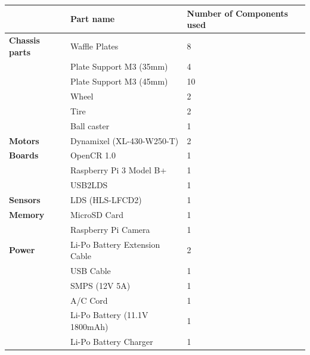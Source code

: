 \documentclass[12pt]{report}
\begin{document}
\begin{table}[H]
\centering
\begin{tabular}{|l|l|l|}
\toprule
              & \textbf{Part name}                     & \textbf{Number of Components used} \\
\midrule
\textbf{Chassis parts} & Waffle Plates                 & 8                         \\ \hline
              & Plate Support M3 (35mm)       & 4                         \\ \hline
              & Plate Support M3 (45mm)       & 10                        \\ \hline
              & Wheel                         & 2                         \\ \hline
              & Tire                          & 2                         \\ \hline
              & Ball caster                   & 1                         \\ \hline
\textbf{Motors}        & Dynamixel (XL-430-W250-T)     & 2                         \\ \hline
\textbf{Boards}        & OpenCR 1.0                    & 1                         \\ \hline
              & Raspberry Pi 3 Model B+       & 1                         \\ \hline
              & USB2LDS                       & 1                         \\ \hline
\textbf{Sensors}       & LDS (HLS-LFCD2)               & 1                         \\ \hline
\textbf{Memory}        & MicroSD Card                  & 1                         \\ \hline
              & Raspberry Pi Camera           & 1                         \\ \hline
\textbf{Power}         & Li-Po Battery Extension Cable & 2                         \\ \hline
              & USB Cable                     & 1                         \\ \hline
              & SMPS (12V 5A)                 & 1                         \\ \hline
              & A/C Cord                      & 1                         \\ \hline
              & Li-Po Battery (11.1V 1800mAh) & 1                         \\ \hline
              & Li-Po Battery Charger         & 1                         \\ \hline

\end{tabular}
\end{table}
\end{document}

